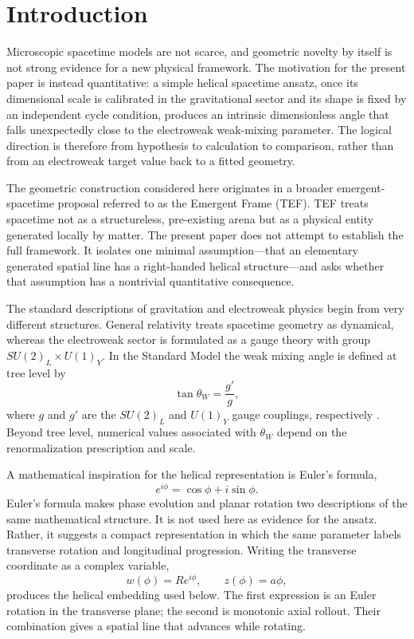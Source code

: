 \documentclass[aps,prd,reprint,nofootinbib,floatfix]{revtex4-2}
\begin{document}
\section{Introduction}

Microscopic spacetime models are not scarce, and geometric novelty by itself is not strong evidence for a new physical framework.  The motivation for the present paper is instead quantitative: a simple helical spacetime ansatz, once its dimensional scale is calibrated in the gravitational sector and its shape is fixed by an independent cycle condition, produces an intrinsic dimensionless angle that falls unexpectedly close to the electroweak weak-mixing parameter.  The logical direction is therefore from hypothesis to calculation to comparison, rather than from an electroweak target value back to a fitted geometry.

The geometric construction considered here originates in a broader emergent-spacetime proposal referred to as the Emergent Frame (TEF).  TEF treats spacetime not as a structureless, pre-existing arena but as a physical entity generated locally by matter.  The present paper does not attempt to establish the full framework.  It isolates one minimal assumption---that an elementary generated spatial line has a right-handed helical structure---and asks whether that assumption has a nontrivial quantitative consequence.

The standard descriptions of gravitation and electroweak physics begin from very different structures.  General relativity treats spacetime geometry as dynamical, whereas the electroweak sector is formulated as a gauge theory with group $SU(2)_L\times U(1)_Y$.  In the Standard Model the weak mixing angle is defined at tree level by
\begin{equation}
\tan\theta_W=\frac{g'}{g},
\label{eq:thetaW}
\end{equation}
where $g$ and $g'$ are the $SU(2)_L$ and $U(1)_Y$ gauge couplings, respectively \cite{PDG2026EW}.  Beyond tree level, numerical values associated with $\theta_W$ depend on the renormalization prescription and scale.

A mathematical inspiration for the helical representation is Euler's formula,
\begin{equation}
e^{i\phi}=\cos\phi+i\sin\phi.
\label{eq:euler}
\end{equation}
Euler's formula makes phase evolution and planar rotation two descriptions of the same mathematical structure.  It is not used here as evidence for the ansatz.  Rather, it suggests a compact representation in which the same parameter labels transverse rotation and longitudinal progression.  Writing the transverse coordinate as a complex variable,
\begin{equation}
w(\phi)=R e^{i\phi},\qquad z(\phi)=a\phi,
\label{eq:eulerhelix}
\end{equation}
produces the helical embedding used below.  The first expression is an Euler rotation in the transverse plane; the second is monotonic axial rollout.  Their combination gives a spatial line that advances while rotating.
\end{document}
